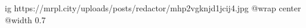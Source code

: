  
 
 
 
 

\ifcmt
  ig https://mrpl.city/uploads/posts/redactor/mhp2vgknjd1jcij4.jpg
  @wrap center
  @width 0.7
\fi
